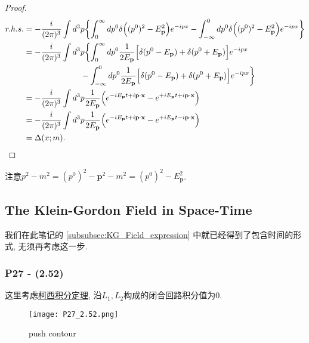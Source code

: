 \documentclass[cn,hazy,green,11pt,device=normal,chinesefont=founder]{elegantnote}
\begin{document}
\begin{proof}
  \begin{equation}
    \begin{aligned}
      r. h. s. &= -\frac{i}{(2\pi)^3}\int d^3 p \biggl\{ \int_{0}^{\infty}dp^0\delta\Bigl((p^0)^2 - E_\mathbf{p}^2\Bigr)e^{-ipx} - \int_{-\infty}^{0}dp^0\delta\Bigl((p^0)^2 - E_\mathbf{p}^2\Bigr)e^{-ipx} \biggr\} \\
               &= -\frac{i}{(2\pi)^3}\int d^3 p \biggl\{ \int_{0}^{\infty}dp^0\frac{1}{2E_\mathbf{p}}\Bigl[\delta(p^0 - E_\mathbf{p}) + \delta(p^0 + E_\mathbf{p}) \Bigr]e^{-ipx} \\
               &\qquad \qquad \qquad \quad - 
               \int_{-\infty}^{0}dp^0\frac{1}{2E_\mathbf{p}}\Bigl[\delta(p^0 - E_\mathbf{p}) + \delta(p^0 + E_\mathbf{p}) \Bigr]e^{-ipx}\biggr\} \\
               &= -\frac{i}{(2\pi)^3} \int d^3 p \frac{1}{2E_\mathbf{p}} \Bigl(e^{-iE_\mathbf{p} t + i \mathbf{p} \cdot \mathbf{x}} - e^{+iE_\mathbf{p} t + i \mathbf{p} \cdot \mathbf{x}}\Bigr) \\ 
               &= -\frac{i}{(2\pi)^3} \int d^3 p \frac{1}{2E_\mathbf{p}} \Bigl(e^{-iE_\mathbf{p} t + i \mathbf{p} \cdot \mathbf{x}} - e^{+iE_\mathbf{p} t - i \mathbf{p} \cdot \mathbf{x}}\Bigr) \\
               &= \Delta(x; m). 
    \end{aligned}
  \end{equation}
\end{proof}

\begin{remark}
  注意$p^2 - m^2 = (p^0)^2 - \mathbf{p}^2 - m^2 = (p^0)^2 - E_\mathbf{p}^2$. 
\end{remark}

\subsection{The Klein-Gordon Field in Space-Time}

我们在此笔记的 \ref{subsubsec:KG_Field_expression} 中就已经得到了包含时间的形式, 无须再考虑这一步. 

\subsubsection{P27 - (2.52)}
这里考虑\href{https://zh.wikipedia.org/wiki/柯西积分定理}{柯西积分定理}, 
沿$L_1, L_2$构成的闭合回路积分值为0. 

\begin{figure}[htbp]
  \centering
  \texttt{[image: P27\_2.52.png]}
  \caption{push contour}
  \label{fig: pushcon}
\end{figure}
\end{document}

